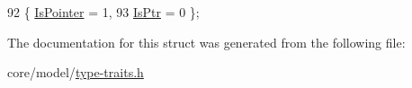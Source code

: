 \begin{DoxyCode}
92             \{ \hyperlink{structTypeTraits_1_1PointerTraits_3_01U_01_5_01_4_aa7cd8f8cbce42367285255b763869563a65cc154c13b6fc6cd5b7ada21a1fc079}{IsPointer} = 1,          
93                           \hyperlink{structTypeTraits_1_1PointerTraits_3_01U_01_5_01_4_aa7cd8f8cbce42367285255b763869563a54e37622c3c2ec85a6fc8de99589e749}{IsPtr} = 0               \};
\end{DoxyCode}


The documentation for this struct was generated from the following file\+:\begin{DoxyCompactItemize}
\item 
core/model/\hyperlink{type-traits_8h}{type-\/traits.\+h}\end{DoxyCompactItemize}
